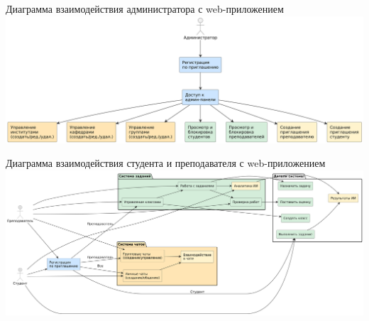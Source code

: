 \documentclass[aspectratio=169]{beamer}
\begin{document}
\begin{frame}{Диаграмма взаимодействия администратора с web-приложением}
    \centering
    \includegraphics[width=\linewidth]{static/AdminFlowchart.png}
\end{frame}

%

\begin{frame}{Диаграмма взаимодействия студента и преподавателя с web-приложением}
    \centering
    \includegraphics[width=\linewidth]{static/TeacherStudentFlowchart.png}
\end{frame}

%
%
%
\end{document}

